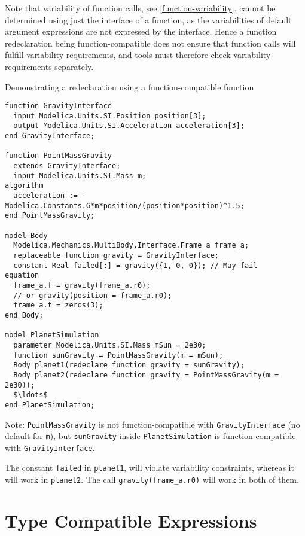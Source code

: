 Note that variability of function calls, see \cref{function-variability}, cannot be determined using just the interface of a function, as the variabilities of default argument expressions are not expressed by the interface.
Hence a function redeclaration being function-compatible does not ensure that function calls will fulfill variability requirements, and tools must therefore check variability requirements separately.

\begin{example}
Demonstrating a redeclaration using a function-compatible function
\begin{lstlisting}[language=modelica]
function GravityInterface
  input Modelica.Units.SI.Position position[3];
  output Modelica.Units.SI.Acceleration acceleration[3];
end GravityInterface;

function PointMassGravity
  extends GravityInterface;
  input Modelica.Units.SI.Mass m;
algorithm
  acceleration := -Modelica.Constants.G*m*position/(position*position)^1.5;
end PointMassGravity;

model Body
  Modelica.Mechanics.MultiBody.Interface.Frame_a frame_a;
  replaceable function gravity = GravityInterface;
  constant Real failed[:] = gravity({1, 0, 0}); // May fail
equation
  frame_a.f = gravity(frame_a.r0);
  // or gravity(position = frame_a.r0);
  frame_a.t = zeros(3);
end Body;

model PlanetSimulation
  parameter Modelica.Units.SI.Mass mSun = 2e30;
  function sunGravity = PointMassGravity(m = mSun);
  Body planet1(redeclare function gravity = sunGravity);
  Body planet2(redeclare function gravity = PointMassGravity(m = 2e30));
  $\ldots$
end PlanetSimulation;
\end{lstlisting}

Note: \lstinline!PointMassGravity! is not function-compatible with
\lstinline!GravityInterface! (no default for \lstinline!m!), but \lstinline!sunGravity!
inside \lstinline!PlanetSimulation! is function-compatible with
\lstinline!GravityInterface!.

The constant \lstinline!failed! in \lstinline!planet1!, will violate variability constraints, whereas it will work in \lstinline!planet2!.
The call \lstinline!gravity(frame_a.r0)! will work in both of them.
\end{example}

\section{Type Compatible Expressions}\label{type-compatible-expressions}

